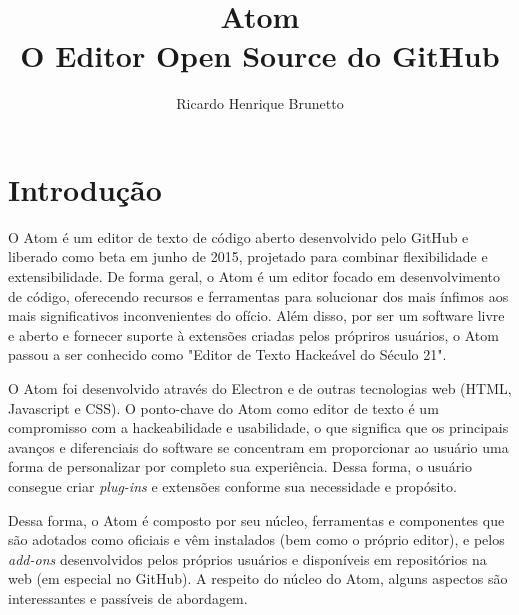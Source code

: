 

\sloppy

\title{Atom\\O Editor Open Source do GitHub}

\author{Ricardo Henrique Brunetto}


\address{Departamento de Informática -- Universidade Estadual de Maringá (UEM)\\
	Maringá -- PR -- Brasil
}



	\maketitle

	{}

  \section{Introdução}
	O Atom é um editor de texto de código aberto desenvolvido pelo GitHub e liberado como beta em junho de 2015, projetado para combinar flexibilidade e extensibilidade. De forma geral, o Atom é um editor focado em desenvolvimento de código, oferecendo recursos e ferramentas para solucionar dos mais ínfimos aos mais significativos inconvenientes do ofício. Além disso, por ser um software livre e aberto e fornecer suporte à extensões criadas pelos própriros usuários, o Atom passou a ser conhecido como "Editor de Texto Hackeável do Século 21".

	O Atom foi desenvolvido através do Electron e de outras tecnologias web (HTML, Javascript e CSS). O ponto-chave do Atom como editor de texto é um compromisso com a hackeabilidade e usabilidade, o que significa que os principais avanços e diferenciais do software se concentram em proporcionar ao usuário uma forma de personalizar por completo sua experiência. Dessa forma, o usuário consegue criar \textit{plug-ins} e extensões conforme sua necessidade e propósito.

	Dessa forma, o Atom é composto por seu núcleo, ferramentas e componentes que são adotados como oficiais e vêm instalados (bem como o próprio editor), e pelos \textit{add-ons} desenvolvidos pelos próprios usuários e disponíveis em repositórios na web (em especial no GitHub). A respeito do núcleo do Atom, alguns aspectos são interessantes e passíveis de abordagem.

